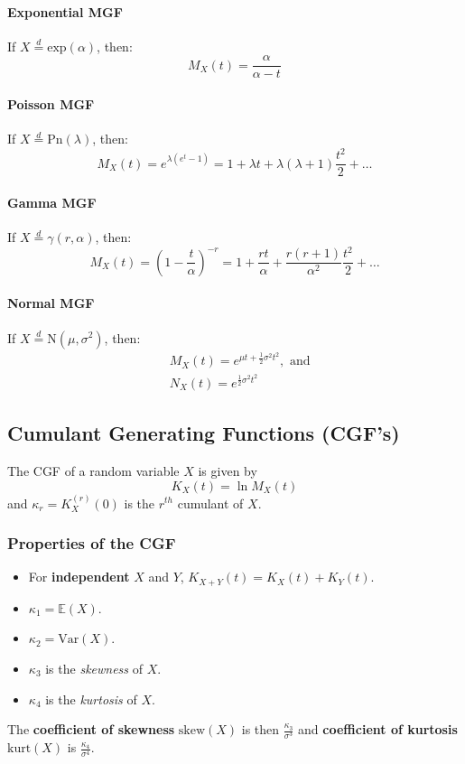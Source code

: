 \documentclass[titlepage,twocolumn]{article}
\begin{document}
\paragraph{Exponential MGF}
If $X\stackrel{d}{=}\mbox{exp}(\alpha)$, then: $$M_X(t) = \frac{\alpha}{\alpha - t}$$
\paragraph{Poisson MGF}
If $X\stackrel{d}{=}\mbox{Pn}(\lambda)$, then: $$M_X(t) = e^{\lambda(e^t-1)} = 1 + \lambda t + \lambda(\lambda + 1)\frac{t^2}{2} + \dots$$
\paragraph{Gamma MGF}
If $X\stackrel{d}{=}\gamma(r,\alpha)$, then: $$M_X(t) = \left( 1- \frac{t}{\alpha} \right)^{-r} = 1 + \frac{rt}{\alpha} + \frac{r(r+1)}{\alpha^2}\frac{t^2}{2} + \dots$$
\paragraph{Normal MGF}
If $X\stackrel{d}{=}\mbox{N}(\mu, \sigma^2)$, then:
\begin{align*}
    &M_X(t) = e^{\mu t + \frac{1}{2}\sigma^2t^2},\mbox{ and}\\
    &N_X(t) = e^{\frac{1}{2}\sigma^2t^2}
\end{align*}

\subsection*{Cumulant Generating Functions (CGF's)}
The CGF of a random variable $X$ is given by $$K_X(t) = \ln M_X(t)$$ and $\kappa_r = K_X^{(r)}(0)$ is the $r^{th}$ cumulant of $X$.
\subsubsection*{Properties of the CGF}
\begin{itemize}
    \item For \textbf{independent} $X$ and $Y$, $K_{X+Y}(t)=K_{X}(t)+K_{Y}(t)$.
    \item $\kappa_1 = \mathbb{E}(X)$.
    \item $\kappa_2 = \mbox{Var}(X)$.
    \item $\kappa_3$ is the \textit{skewness} of $X$.
    \item $\kappa_4$ is the \textit{kurtosis} of $X$.
\end{itemize}
The \textbf{coefficient of skewness} $\mbox{skew}(X)$ is then $\frac{\kappa_3}{\sigma^3}$ and \textbf{coefficient of kurtosis} $\mbox{kurt}(X)$ is $\frac{\kappa_4}{\sigma^4}$.
\end{document}
